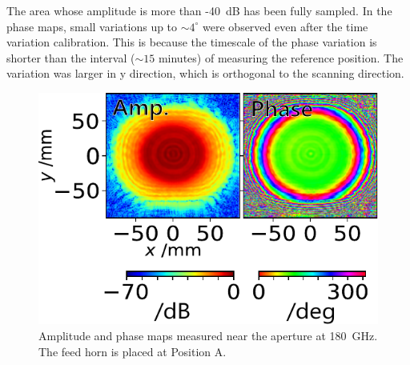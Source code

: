 \documentclass[journal]{IEEEtran}
\begin{document}
The area whose amplitude is more than -40~dB has been fully sampled. In the phase maps, small variations up to $\sim 4^\circ$ were observed even after the time variation calibration. This is because the timescale of the phase variation is shorter than the interval ($\sim 15$ minutes) of measuring the reference position. 
The variation was larger in y direction, which is orthogonal to the scanning direction.
\begin{figure}[!t]
\centering
\includegraphics[width=0.9\linewidth]{Figures/NF_f1_Vpol.pdf}
\caption{%
Amplitude and phase maps measured near the aperture at 180~GHz. The feed horn is placed at Position A.
}
\label{fig:NF_f1_Vpol}
\end{figure}
%
%
\end{document}
